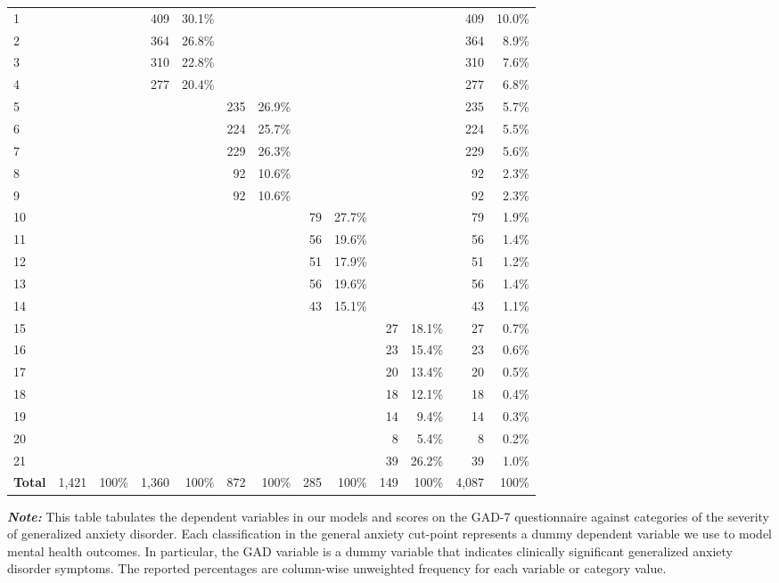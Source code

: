 \documentclass{article}[12pt]
\begin{document}
\begin{table}[h!]
{\begin{tabular}{lrrrrrrrrrrrr}
                1&&&409&30.1\%&&&&&&&409&10.0\% \\
                2&&&364&26.8\%&&&&&&&364&8.9\% \\
                3&&&310&22.8\%&&&&&&&310&7.6\% \\
                4&&&277&20.4\%&&&&&&&277&6.8\% \\
                5&&&&&235&26.9\%&&&&&235&5.7\% \\
                6&&&&&224&25.7\%&&&&&224&5.5\% \\
                7&&&&&229&26.3\%&&&&&229&5.6\% \\
                8&&&&&92&10.6\%&&&&&92&2.3\% \\
                9&&&&&92&10.6\%&&&&&92&2.3\% \\
                10&&&&&&&79&27.7\%&&&79&1.9\% \\
                11&&&&&&&56&19.6\%&&&56&1.4\% \\
                12&&&&&&&51&17.9\%&&&51&1.2\% \\
                13&&&&&&&56&19.6\%&&&56&1.4\% \\
                14&&&&&&&43&15.1\%&&&43&1.1\% \\
                15&&&&&&&&&27&18.1\%&27&0.7\% \\
                16&&&&&&&&&23&15.4\%&23&0.6\% \\
                17&&&&&&&&&20&13.4\%&20&0.5\% \\
                18&&&&&&&&&18&12.1\%&18&0.4\% \\
                19&&&&&&&&&14&9.4\%&14&0.3\% \\
                20&&&&&&&&&8&5.4\%&8&0.2\% \\
                21&&&&&&&&&39&26.2\%&39&1.0\% \\
                \textbf{Total}&1,421&100\%&1,360&100\%&872&100\%&285&100\%&149&100\%&4,087&100\% \\
                \hline
            \end{tabular}
            }
            \begin{tablenotes}
                    \item
                    \textit{\bf Note:} This table tabulates the dependent variables in our models and scores on the GAD-7 questionnaire against categories of the severity of generalized anxiety disorder. Each classification in the general anxiety cut-point represents a dummy dependent variable we use to model mental health outcomes. In particular, the GAD variable is a dummy variable that indicates clinically significant generalized anxiety disorder symptoms. The reported percentages are column-wise unweighted frequency for each variable or category value.
                \end{tablenotes}
            \label{tab:categories}
        \end{table}
        
\end{document}
